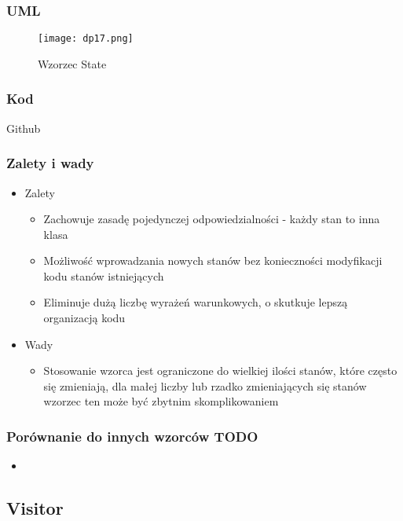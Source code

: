 \documentclass[a4paper,15pt]{article}
\begin{document}
\subsubsection{UML}

\begin{figure}[H]
\centering
  \texttt{[image: dp17.png]}
  \caption{Wzorzec State}
\end{figure}

\subsubsection{Kod}
Github

\subsubsection{Zalety i wady}


\begin{itemize}
\item Zalety
\begin{itemize}
\item Zachowuje zasadę pojedynczej odpowiedzialności - każdy stan to inna klasa
\item Możliwość wprowadzania nowych stanów bez konieczności modyfikacji kodu stanów istniejących
\item Eliminuje dużą liczbę wyrażeń warunkowych, o skutkuje lepszą organizacją kodu
\end{itemize}
\item Wady
\begin{itemize}
\item Stosowanie wzorca jest ograniczone do wielkiej ilości stanów, które często się zmieniają, dla małej liczby lub rzadko zmieniających się stanów wzorzec ten może być zbytnim skomplikowaniem
\end{itemize}
\end{itemize}


\subsubsection{Porównanie do innych wzorców TODO}
\begin{itemize}
\item
\end{itemize}




\newpage
\subsection{Visitor}
\end{document}
